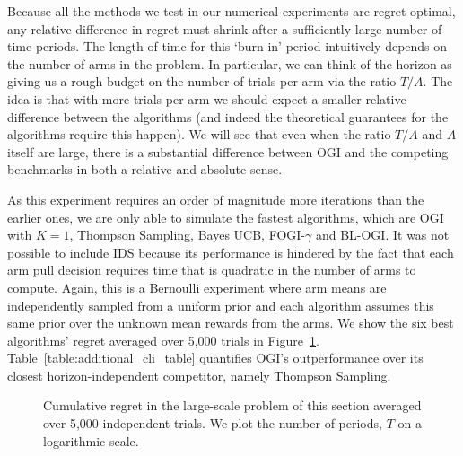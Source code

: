 Because all the methods we test in our numerical experiments are regret optimal, any relative difference in regret must shrink after a sufficiently large number of time periods. The length of time for this `burn in' period intuitively depends on the number of arms in the problem.
In particular, we can think of the horizon as giving us a rough budget on the number of trials per arm via the ratio $T/A$.
The idea is that with more trials per arm we should expect a smaller relative difference between the algorithms (and indeed the theoretical guarantees for the algorithms require this happen). 
We will see that even when the ratio $T/A$ and $A$ itself are large, there is a substantial difference between OGI and the competing benchmarks in both a relative and absolute sense.

As this experiment requires an order of magnitude more iterations than the earlier ones, we are only able to simulate the fastest algorithms, which are {OGI with $K=1$, Thompson Sampling, Bayes UCB, FOGI-$\gamma$ and BL-OGI. 
}
It was not possible to include IDS because its performance is hindered by the fact that each arm pull decision requires time that is quadratic in the number of arms to compute. 
Again, this is a Bernoulli experiment where arm means are independently sampled from a uniform prior and each algorithm assumes this same prior over the unknown mean rewards from the arms.
We show the {\color{blue} six best} algorithms' regret averaged over 5,000 trials in Figure~\ref{fig:chapelle_and_li}. {\color{blue}Table~\ref{table:additional_cli_table} quantifies OGI's outperformance over its closest horizon-independent competitor, namely Thompson Sampling.}
{
\color{blue}
\begin{figure}[h!]
	\centering
	
	\caption{Cumulative regret in the large-scale problem of this section averaged over 5,000 independent trials.
		We plot the number of periods, $T$ on a logarithmic scale.}
	\label{fig:chapelle_and_li}
\end{figure}
}

